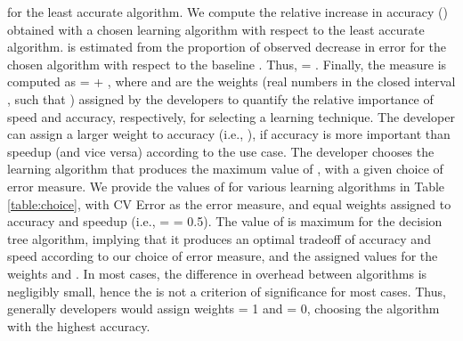 \documentclass[conference]{IEEEtran}
\begin{document}
   for the least accurate algorithm.
We compute the relative increase in accuracy () obtained with a chosen learning algorithm with respect
    to the least accurate algorithm.  is estimated from the proportion of observed decrease in error for the chosen algorithm with respect to the baseline
    . Thus,
    = .
   Finally, the measure   is computed as  =  + ,
   where  and  are the weights
  (real numbers in the closed interval , such that ) assigned by the developers to quantify
   the relative importance of speed and  accuracy, respectively, for selecting a learning technique. The
   developer can assign a larger weight to accuracy (i.e., ), if accuracy is more important than speedup (and vice versa)
   according to the use case. The developer chooses the learning algorithm that produces the
   maximum value of , with a given choice of error measure.
   We provide the values of  for various learning algorithms in Table \ref{table:choice}, with
    CV Error as the error measure, and equal weights assigned to accuracy and speedup (i.e.,  =  = 0.5).
    The value of  is maximum for the decision tree algorithm, implying that it produces an optimal tradeoff of accuracy and speed according to our choice of error measure, and the assigned values for the weights  and .
    In most cases, the difference in overhead between algorithms is negligibly small, hence the  is
    not a criterion of significance for most cases. Thus, generally developers would assign weights  = 1
    and  = 0, choosing the algorithm with the highest accuracy. 
\end{document}
